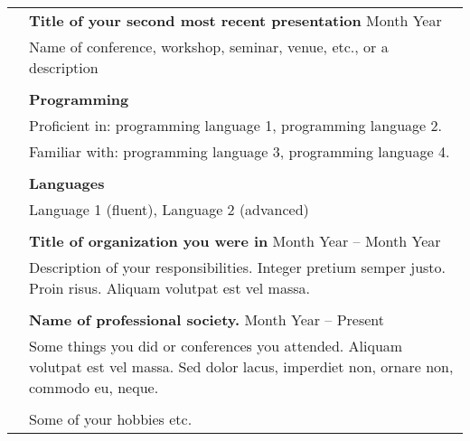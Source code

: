\documentclass[letterpaper, 11pt]{article}
\begin{document}
\begin{longtable}{p{1.3in}p{4.8in}}
& \textbf{Title of your second most recent presentation} \hfill Month Year \\
& Name of conference, workshop, seminar, venue, etc., or a description \\
& \\


{\color{OliveGreen}{Skills}} 
& \textbf{Programming}\\
& Proficient in: programming language 1, programming language 2. \\
& Familiar with: programming language 3, programming language 4. \\
& \\

& \textbf{Languages} \\
& Language 1 (fluent), Language 2 (advanced) \\
& \\


\color{OliveGreen}{Service and outreach}
& \textbf{Title of organization you were in} \hfill Month Year -- Month Year \\
& Description of your responsibilities. Integer pretium semper justo. Proin risus. Aliquam volutpat est vel massa. \\
& \\


{\color{OliveGreen}{Professional}} 
& {\textbf{Name of professional society.}} \hfill Month Year -- Present \\
{\color{OliveGreen}{memberships}} 
& Some things you did or conferences you attended. Aliquam volutpat est vel massa. Sed dolor lacus, imperdiet non, ornare non, commodo eu, neque. \\
& \\


\nohyphens{\color{OliveGreen}{Other interests}} & Some of your hobbies etc.\\


\end{longtable}
\end{document}
